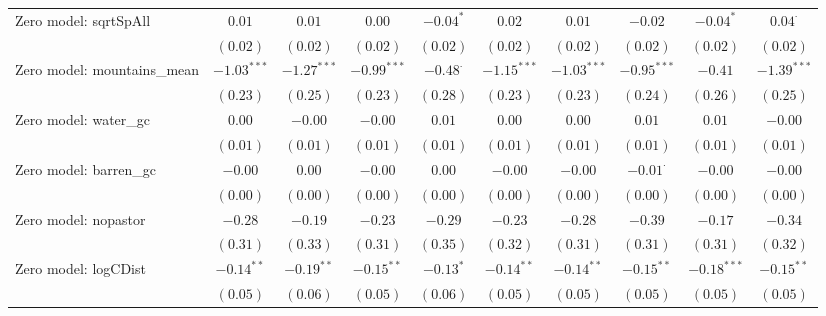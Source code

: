 \begin{sidewaystable}
\begin{center}
{\begin{tabular}{l c c c c c c c c c}
Zero model: sqrtSpAll          & $0.01$         & $0.01$        & $0.00$         & $-0.04^{*}$     & $0.02$         & $0.01$         & $-0.02$         & $-0.04^{*}$     & $0.04^{\cdot}$ \\
                               & $(0.02)$       & $(0.02)$      & $(0.02)$       & $(0.02)$        & $(0.02)$       & $(0.02)$       & $(0.02)$        & $(0.02)$        & $(0.02)$       \\
Zero model: mountains\_mean    & $-1.03^{***}$  & $-1.27^{***}$ & $-0.99^{***}$  & $-0.48^{\cdot}$ & $-1.15^{***}$  & $-1.03^{***}$  & $-0.95^{***}$   & $-0.41$         & $-1.39^{***}$  \\
                               & $(0.23)$       & $(0.25)$      & $(0.23)$       & $(0.28)$        & $(0.23)$       & $(0.23)$       & $(0.24)$        & $(0.26)$        & $(0.25)$       \\
Zero model: water\_gc          & $0.00$         & $-0.00$       & $-0.00$        & $0.01$          & $0.00$         & $0.00$         & $0.01$          & $0.01$          & $-0.00$        \\
                               & $(0.01)$       & $(0.01)$      & $(0.01)$       & $(0.01)$        & $(0.01)$       & $(0.01)$       & $(0.01)$        & $(0.01)$        & $(0.01)$       \\
Zero model: barren\_gc         & $-0.00$        & $0.00$        & $-0.00$        & $0.00$          & $-0.00$        & $-0.00$        & $-0.01^{\cdot}$ & $-0.00$         & $-0.00$        \\
                               & $(0.00)$       & $(0.00)$      & $(0.00)$       & $(0.00)$        & $(0.00)$       & $(0.00)$       & $(0.00)$        & $(0.00)$        & $(0.00)$       \\
Zero model: nopastor           & $-0.28$        & $-0.19$       & $-0.23$        & $-0.29$         & $-0.23$        & $-0.28$        & $-0.39$         & $-0.17$         & $-0.34$        \\
                               & $(0.31)$       & $(0.33)$      & $(0.31)$       & $(0.35)$        & $(0.32)$       & $(0.31)$       & $(0.31)$        & $(0.31)$        & $(0.32)$       \\
Zero model: logCDist           & $-0.14^{**}$   & $-0.19^{**}$  & $-0.15^{**}$   & $-0.13^{*}$     & $-0.14^{**}$   & $-0.14^{**}$   & $-0.15^{**}$    & $-0.18^{***}$   & $-0.15^{**}$   \\
                               & $(0.05)$       & $(0.06)$      & $(0.05)$       & $(0.06)$        & $(0.05)$       & $(0.05)$       & $(0.05)$        & $(0.05)$        & $(0.05)$       \\

\end{tabular}}
\end{center}
\end{sidewaystable}
